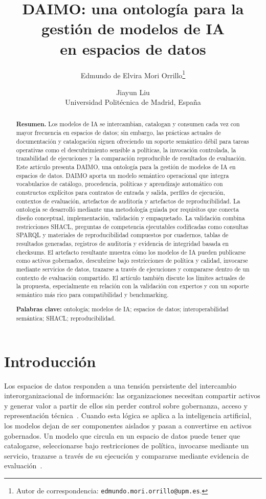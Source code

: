 \documentclass[11pt,a4paper]{article}
\title{DAIMO: una ontología para la gestión de modelos de IA\\en espacios de datos}
\author{Edmundo de Elvira Mori Orrillo\thanks{Autor de correspondencia: \texttt{edmundo.mori.orrillo@upm.es}.} \and Jiayun Liu \\[0.5em]
\normalsize Universidad Politécnica de Madrid, España}
\date{}
\begin{document}
\maketitle

\begin{abstract}
\noindent\textbf{Resumen.}
Los modelos de IA se intercambian, catalogan y consumen cada vez con mayor frecuencia en espacios de datos; sin embargo, las prácticas actuales de documentación y catalogación siguen ofreciendo un soporte semántico débil para tareas operativas como el descubrimiento sensible a políticas, la invocación controlada, la trazabilidad de ejecuciones y la comparación reproducible de resultados de evaluación. Este artículo presenta DAIMO, una ontología para la gestión de modelos de IA en espacios de datos. DAIMO aporta un modelo semántico operacional que integra vocabularios de catálogo, procedencia, políticas y aprendizaje automático con constructos explícitos para contratos de entrada y salida, perfiles de ejecución, contextos de evaluación, artefactos de auditoría y artefactos de reproducibilidad. La ontología se desarrolló mediante una metodología guiada por requisitos que conecta diseño conceptual, implementación, validación y empaquetado. La validación combina restricciones SHACL, preguntas de competencia ejecutables codificadas como consultas SPARQL y materiales de reproducibilidad compuestos por cuadernos, tablas de resultados generadas, registros de auditoría y evidencia de integridad basada en checksums. El artefacto resultante muestra cómo los modelos de IA pueden publicarse como activos gobernados, descubrirse bajo restricciones de política y calidad, invocarse mediante servicios de datos, trazarse a través de ejecuciones y compararse dentro de un contexto de evaluación compartido. El artículo también discute los límites actuales de la propuesta, especialmente en relación con la validación con expertos y con un soporte semántico más rico para compatibilidad y benchmarking.

\medskip
\noindent\textbf{Palabras clave:} ontología; modelos de IA; espacios de datos; interoperabilidad semántica; SHACL; reproducibilidad.
\end{abstract}

\section{Introducción}\label{sec:intro}

Los espacios de datos responden a una tensión persistente del intercambio interorganizacional de información: las organizaciones necesitan compartir activos y generar valor a partir de ellos sin perder control sobre gobernanza, acceso y representación técnica~\cite{franklin05,otto19,cappiello22,werbrouck24}. Cuando esta lógica se aplica a la inteligencia artificial, los modelos dejan de ser componentes aislados y pasan a convertirse en activos gobernados. Un modelo que circula en un espacio de datos puede tener que catalogarse, seleccionarse bajo restricciones de política, invocarse mediante un servicio, trazarse a través de su ejecución y compararse mediante evidencia de evaluación~\cite{otto19,cappiello22,werbrouck24}.
\end{document}
